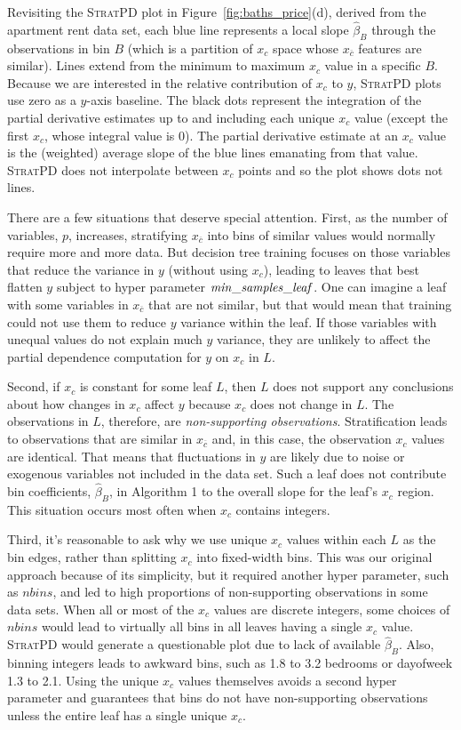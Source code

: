 \documentclass[12pt]{article}
\newcommand{\figref}[1]{Figure~\ref{#1}}
\newcommand{\spd}{\fontfamily{cmr}\textsc{\small StratPD}}
\newcommand{\xnc}{$x_{\overline{c}}$}
\begin{document}
Revisiting the \spd{} plot in \figref{fig:baths_price}(d), derived from the apartment rent data set, each blue line represents a local slope $\hat{\beta}_B$ through the observations in bin $B$ (which is a partition of $x_c$ space whose \xnc{} features are similar). Lines extend from the minimum to maximum $x_c$ value in a specific $B$.  Because we are interested in the relative contribution of $x_c$ to $y$, \spd{} plots use zero as a $y$-axis baseline. The black dots represent the integration of the partial derivative estimates up to and including each unique $x_c$ value (except the first $x_c$, whose integral value is 0). The partial derivative estimate at an $x_c$ value is the (weighted) average slope of the blue lines emanating from that value. \spd{} does not interpolate between $x_c$ points and so the plot shows dots not lines. 

There are a few situations that deserve special attention. First, as the number of  variables, $p$, increases, stratifying \xnc{} into bins of similar values would normally require more and more data. But decision tree training focuses on those variables that reduce the variance in $y$ (without using $x_c$), leading to leaves that best flatten $y$ subject to hyper parameter ${\it min\_samples\_leaf}$. One can imagine a leaf with some variables in \xnc{} that are not similar, but that would mean that training could not use them to reduce $y$ variance within the leaf. If those variables with unequal values do not explain much $y$ variance, they are unlikely to affect the partial dependence computation for $y$ on $x_c$ in $L$.

Second, if $x_c$ is constant for some leaf $L$, then $L$ does not support any conclusions about how changes in $x_c$ affect $y$ because $x_c$ does not change in $L$.  The observations in $L$, therefore, are {\it non-supporting observations}. Stratification leads to observations that are similar in \xnc{} and, in this case, the observation $x_c$ values are identical. That means that fluctuations in $y$ are likely due to noise or exogenous variables not included in the data set. Such a leaf does not contribute bin coefficients, $\hat{\beta}_B$, in Algorithm 1 to the overall slope for the leaf's $x_c$ region. This situation occurs most often when $x_c$ contains integers.

Third, it's reasonable to ask why we use unique $x_c$ values within each $L$ as the bin edges, rather than splitting $x_c$ into fixed-width bins.  This was our original approach because of its simplicity, but it required another hyper parameter, such as $nbins$, and led to high proportions of non-supporting observations in some data sets. When all or most of the $x_c$ values are discrete integers, some choices of $nbins$ would lead to virtually all bins in all leaves having a single $x_c$ value. \spd{} would generate a questionable plot due to lack of available $\hat{\beta}_B$. Also, binning integers leads to awkward bins, such as 1.8 to 3.2 bedrooms or dayofweek 1.3 to 2.1.  Using the unique $x_c$ values themselves avoids a second hyper parameter and guarantees that bins do not have non-supporting observations unless the entire leaf has a single unique $x_c$.
\end{document}
